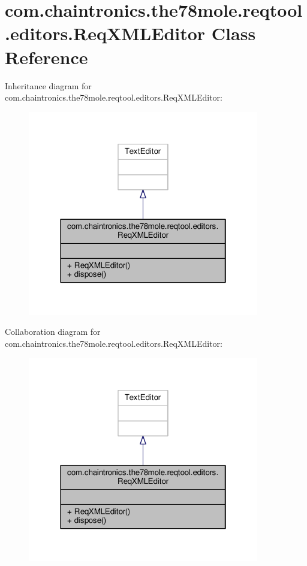 \hypertarget{classcom_1_1chaintronics_1_1the78mole_1_1reqtool_1_1editors_1_1ReqXMLEditor}{}\section{com.\+chaintronics.\+the78mole.\+reqtool.\+editors.\+Req\+X\+M\+L\+Editor Class Reference}
\label{classcom_1_1chaintronics_1_1the78mole_1_1reqtool_1_1editors_1_1ReqXMLEditor}


Inheritance diagram for com.\+chaintronics.\+the78mole.\+reqtool.\+editors.\+Req\+X\+M\+L\+Editor\+:\nopagebreak
\begin{figure}[H]
\begin{center}
\leavevmode
\includegraphics[width=286pt]{dc/d84/classcom_1_1chaintronics_1_1the78mole_1_1reqtool_1_1editors_1_1ReqXMLEditor__inherit__graph}
\end{center}
\end{figure}


Collaboration diagram for com.\+chaintronics.\+the78mole.\+reqtool.\+editors.\+Req\+X\+M\+L\+Editor\+:\nopagebreak
\begin{figure}[H]
\begin{center}
\leavevmode
\includegraphics[width=286pt]{d1/df9/classcom_1_1chaintronics_1_1the78mole_1_1reqtool_1_1editors_1_1ReqXMLEditor__coll__graph}
\end{center}
\end{figure}
